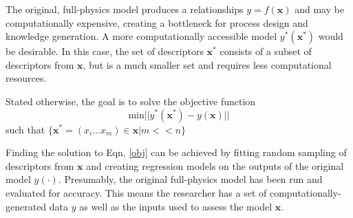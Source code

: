 The original, full-physics model produces a relationships $y = f(\mathbf{x})$ and may be computationally expensive, creating a bottleneck for process design and knowledge generation. A more computationally accessible model $y^*(\mathbf{x^*})$ would be desirable. In this case, the set of descriptors $\mathbf{x^*}$ consists of a subset of descriptors from $\mathbf{x}$, but is a much smaller set and requires less computational resources. 

Stated otherwise, the goal is to solve the objective function
\begin{equation}
	\text{min} ||y^*{(\mathbf{x^*})} - y(\mathbf{x})||
	\label{obj}
\end{equation}
such that $\{\mathbf{x^*} = \left(x_i...x_m\right) \in \mathbf{x} | m << n\}$

Finding the solution to Eqn, \ref{obj} can be achieved by fitting random sampling of descriptors from $\mathbf{x}$ and creating regression models on the outputs of the original model $y(\cdot)$. Presumably, the original full-physics model has been run and evaluated for accuracy. This means the researcher has a set of computationally-generated data $y$ as well as the inputs used to assess the model $\mathbf{x}$. 

